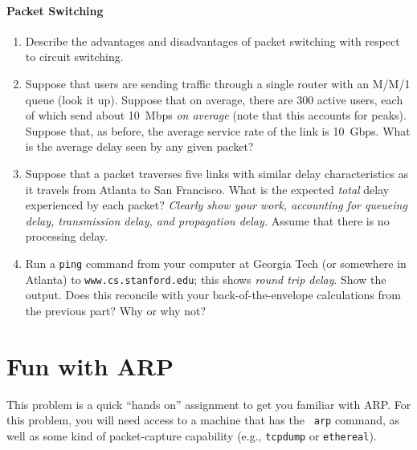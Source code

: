 \documentclass[11pt]{article}
\begin{document}
\paragraph{Packet Switching}
\begin{enumerate}
\item Describe the advantages and disadvantages of packet switching with
  respect to circuit switching.
\item Suppose that users are sending traffic through a single router
  with an M/M/1 queue (look it up).  Suppose that on average, there are
  300 active users, each of which send about 10~Mbps {\em on average}
  (note that this accounts for peaks).  Suppose that, as before, the
  average service rate of the link is 10~Gbps.  What is the average
  delay seen by any given packet?
\item Suppose that a packet traverses five links with similar delay
  characteristics as it travels from Atlanta to San Francisco.  What is
  the expected {\em total} delay experienced by each packet?  {\em
    Clearly show your work, accounting for queueing delay, transmission
    delay, and propagation delay.}  Assume that there is no processing
  delay.
\item Run a {\tt ping} command from your computer at Georgia Tech (or
  somewhere in Atlanta) to {\tt www.cs.stanford.edu}; this shows {\em
    round trip delay}.  Show the output.  Does this reconcile with your
  back-of-the-envelope calculations from the previous part?  Why or why
  not?
\end{enumerate}

\pagebreak

\section{Fun with ARP}

This problem is a quick ``hands on'' assignment to get you familiar with
ARP.  For this problem, you will need access to a machine that has the {\tt
  arp} command, as well as some kind of packet-capture capability (e.g.,
{\tt tcpdump} or {\tt ethereal}).
\end{document}

